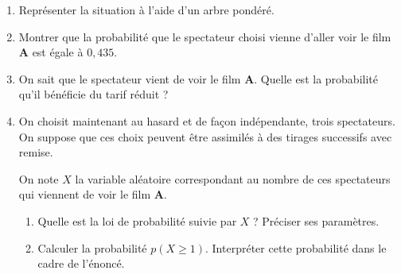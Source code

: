 \begin{enumerate}
     \item %
     Représenter la situation à l'aide d'un arbre pondéré.
     \item %
     Montrer que la probabilité que le spectateur choisi vienne d'aller voir le film \textbf{A} est égale à $0,435$.
     \item %
     On sait que le spectateur vient de voir le film \textbf{A}. Quelle est la probabilité qu'il bénéficie du tarif réduit ?
     \item %
     On choisit maintenant au hasard et de façon indépendante, trois spectateurs. On suppose que ces choix peuvent être assimilés à des tirages successifs avec remise.
     \par
     On note $X$ la variable aléatoire correspondant au nombre de ces spectateurs qui viennent de voir le film \textbf{A}.
     \par
     \begin{enumerate}[label=\alph*.]
          \item %
          Quelle est la loi de probabilité suivie par $X$ ? Préciser ses paramètres.
          \item %
          Calculer la probabilité $p(X \geqslant 1)$. Interpréter cette probabilité dans le cadre de l'énoncé.
          \par
     \end{enumerate}
     \par
\end{enumerate}
